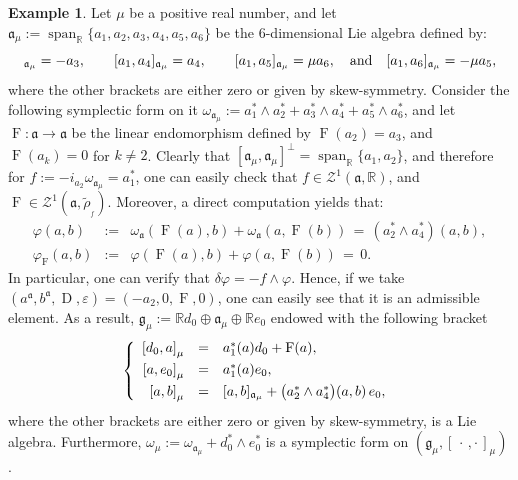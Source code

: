 \documentclass[final,1p,times,nopreprintline]{elsarticle}
\theoremstyle{definition}
\newtheorem{example}{Example}[section]
\numberwithin{equation}{section}
\newcommand{\rel}{\mathbb{R}}
\newcommand{\w}{\omega}
\newcommand{\et}{\quad \textnormal{and}\quad}
\newcommand{\g}{\mathfrak{g}}
\newcommand{\ai}{\mathfrak{a}}
\newcommand{\Span}{\operatorname{span}}
\numberwithin{equation}{section}
\newcommand{\D}{\operatorname{D}}
\newcommand{\ef}{\operatorname{F}}
\newcommand{\cro}{[\,\cdot\,,\cdot\,]}
\begin{document}
\begin{example}
	Let $\mu$ be a positive real number, and let $\ai_\mu:=\Span_\rel\{a_1,a_2,a_3,a_4,a_5,a_6\}$ be the $6$-dimensional Lie algebra defined by: 
	\begin{equation*}
		[a_1,a_3]_{\ai_\mu}=-a_3,\qquad [a_1,a_4]_{\ai_\mu}=a_4,\qquad [a_1,a_5]_{\ai_\mu}=\mu a_6,\et[a_1,a_6]_{\ai_\mu}=-\mu a_5,
	\end{equation*} 
	where the other brackets are either zero or given by skew-symmetry. Consider the following symplectic form on it $\w_{\ai_\mu}:=a_1^*\wedge a_2^*+a_3^*\wedge a_4^*+a_5^*\wedge a_6^*$, and let $\ef:\ai\to\ai$ be the linear endomorphism defined by $\ef(a_2)=a_3$, and $\ef(a_k)=0$ for $k\neq 2$. Clearly that $[\ai_\mu,\ai_\mu]^\perp=\Span_\rel\{a_1,a_2\}$, and therefore for $f:=-i_{a_2}\w_{\ai_\mu}=a_1^*$, one can easily check that $f\in\mathcal{Z}^1(\ai,\rel)$, and $\ef\in\mathcal{Z}^1(\ai,\widetilde{\rho}_{_f})$. Moreover, a direct computation yields that:
	\begin{eqnarray*}
		\varphi(a,b)&:=&\w_\ai(\ef(a),b)+\w_\ai(a,\ef(b))\,=\,\left(a_2^*\wedge a_4^*\right)(a,b),\\
		\varphi_{\ef}(a,b)&:=&\varphi(\ef(a),b)+\varphi(a,\ef(b))\,=\,0.
	\end{eqnarray*}
	In particular, one can verify that $\delta\varphi=-f\wedge\varphi$. Hence, if we take $(a^\ai,b^\ai,\D,\varepsilon)=(-a_2,0,\ef,0)$, one can easily see that it is an admissible element. As a result, $\g_\mu:=\rel d_0\oplus\ai_\mu\oplus\rel e_0$ endowed with the following bracket
	\begin{equation*}
		\left\{
		\begin{array}{r c l}\vspace{1mm}
			\left[d_0,a\right]_\mu&=&a_1^*(a)d_0+\ef(a),\\\vspace{1mm}
			\left[a,e_0\right]_\mu&=&a_1^*(a)e_0,\\
			\left[a,b\right]_\mu&=&[a,b]_{\ai_\mu}+\big(a_2^*\wedge a_4^*\big)(a,b)\,e_0,
			
		\end{array}
		\right.\\
	\end{equation*}
	where the other brackets are either zero or given by skew-symmetry, is a Lie algebra. Furthermore, $\w_\mu:=\w_{\ai_\mu}+d_0^*\wedge e_0^*$ is a symplectic form on $(\g_\mu,\cro_\mu)$.
\end{example}
\end{document}
